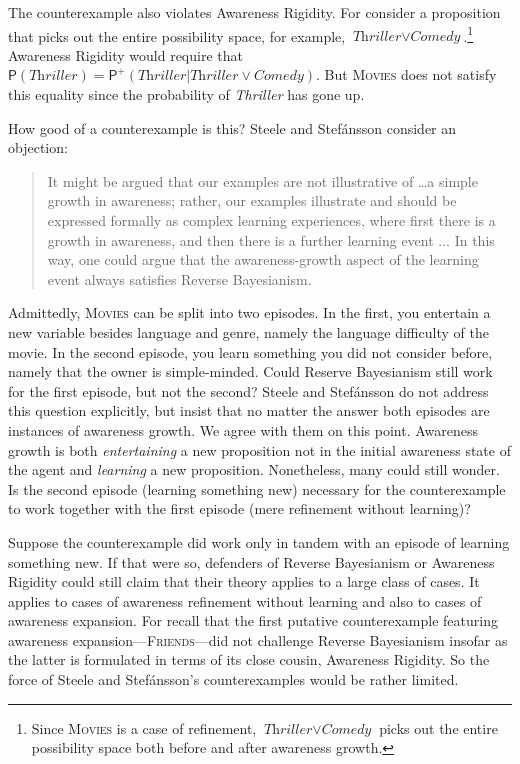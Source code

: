\documentclass[
  11pt,
  dvipsnames,enabledeprecatedfontcommands]{scrartcl}
\newcommand{\pr}[1]{\ensuremath{\mathsf{P}(#1)}}
\newcommand{\ppr}[2]{\ensuremath{\mathsf{P}^{#1}(#2)}}
\begin{document}
The counterexample also violates Awareness Rigidity. For consider a
proposition that picks out the entire possibility space, for example,
\(\textit{Thriller}\vee \textit{Comedy}\).\footnote{Since
  \textsc{Movies} is a case of refinement,
  \(\textit{Thriller}\vee \textit{Comedy}\) picks out the entire
  possibility space both before and after awareness growth.} Awareness
Rigidity would require that
\(\pr{\textit{Thriller}}=\ppr{+}{\textit{Thriller} \vert \textit{Thriller}\vee \textit{Comedy}}\).
But \textsc{Movies} does not satisfy this equality since the probability
of \textit{Thriller} has gone up.

How good of a counterexample is this? Steele and Stefánsson consider an
objection:

\begin{quote}It might be argued that our examples are not illustrative of \dots a simple growth in awareness; rather, our examples illustrate and should be expressed 
  formally as complex learning experiences, where first there is a growth in awareness, and then 
  there is a further learning event ... In this way, one could argue that the awareness-growth 
  aspect of the learning event always satisfies Reverse Bayesianism.
\end{quote}

\doublespace

\noindent  Admittedly, \textsc{Movies} can be split into two episodes.
In the first, you entertain a new variable besides language and genre,
namely the language difficulty of the movie. In the second episode, you
learn something you did not consider before, namely that the owner is
simple-minded. Could Reserve Bayesianism still work for the first
episode, but not the second? Steele and Stefánsson do not address this
question explicitly, but insist that no matter the answer both episodes
are instances of awareness growth. We agree with them on this point.
Awareness growth is both \textit{entertaining} a new proposition not in
the initial awareness state of the agent and \textit{learning} a new
proposition. Nonetheless, many could still wonder. Is the second episode
(learning something new) necessary for the counterexample to work
together with the first episode (mere refinement without learning)?

Suppose the counterexample did work only in tandem with an episode of
learning something new. If that were so, defenders of Reverse
Bayesianism or Awareness Rigidity could still claim that their theory
applies to a large class of cases. It applies to cases of awareness
refinement without learning and also to cases of awareness expansion.
For recall that the first putative counterexample featuring awareness
expansion---\textsc{Friends}---did not challenge Reverse Bayesianism
insofar as the latter is formulated in terms of its close cousin,
Awareness Rigidity. So the force of Steele and Stefánsson's
counterexamples would be rather limited.
\end{document}

